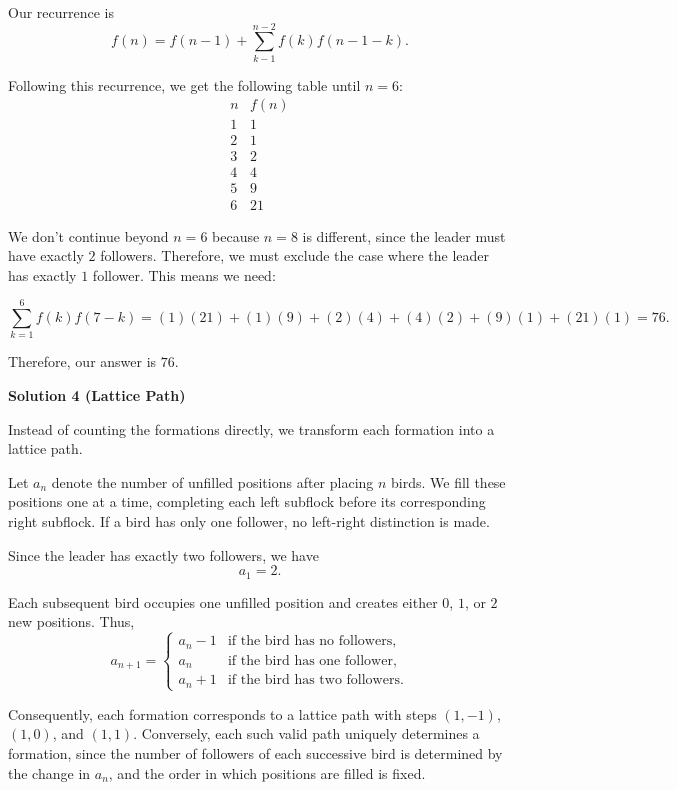\begin{enumerate}
 Our recurrence is 
 \[f(n)=f(n-1)+\sum_{k-1}^{n-2} f(k)f(n-1-k).\]

 Following this recurrence, we get the following table until $n=6$:
 \[\begin{array}{c|l|c} n & f(n)\\ \hline 1 & 1\\ 2 & 1\\ 3 & 2\\ 4 & 4\\ 5 & 9\\ 6 & 21 \end{array}\]

 We don't continue beyond $n=6$ because $n=8$ is different, since the leader must have exactly $2$ followers. Therefore, we must exclude the case where the leader has exactly $1$ follower. This means we need:

 
 \[\sum_{k=1}^6 f(k)f(7-k) = (1)(21)+(1)(9)+(2)(4)+(4)(2)+(9)(1)+(21)(1) = 76.\]

 Therefore, our answer is $\boxed{76}$.

 


 



\textbf{Solution 4 (Lattice Path)}

Instead of counting the formations directly, we transform each formation into a lattice path.

 Let $a_n$ denote the number of unfilled positions after placing $n$ birds. We fill these positions one at a time, completing each left subflock before its corresponding right subflock. If a bird has only one follower, no left-right distinction is made.

 Since the leader has exactly two followers, we have
 \[a_1=2.\]

 Each subsequent bird occupies one unfilled position and creates either $0$, $1$, or $2$ new positions. Thus,
 \[a_{n+1}= \begin{cases} a_n-1 & \text{if the bird has no followers},\\ a_n & \text{if the bird has one follower},\\ a_n+1 & \text{if the bird has two followers}. \end{cases}\]

 Consequently, each formation corresponds to a lattice path with steps $(1,-1)$, $(1,0)$, and $(1,1)$. Conversely, each such valid path uniquely determines a formation, since the number of followers of each successive bird is determined by the change in $a_n$, and the order in which positions are filled is fixed.


\end{enumerate}
